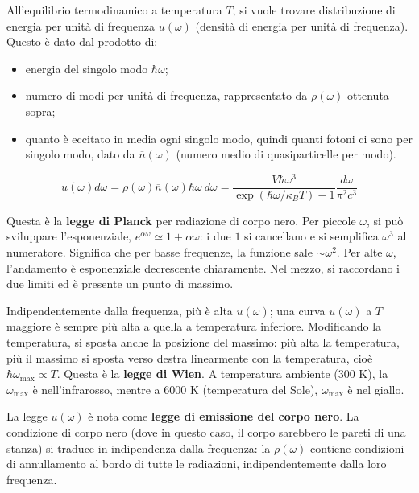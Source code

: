 \documentclass[10pt, a4paper]{scrartcl}
\numberwithin{equation}{subsection}
\theoremstyle{style1}
\theoremstyle{style2}
\newenvironment{boxenv}[1][]{
    \begin{eqbox}[#1]
    }{
   \end{eqbox}
}
\begin{document}
All'equilibrio termodinamico a temperatura $T$, si vuole trovare distribuzione di energia per unit\`a di frequenza $u(\omega)$ (densit\`a di energia per unit\`a di frequenza). 
Questo \`e dato dal prodotto di:
\begin{itemize}
	\item energia del singolo modo $\hbar \omega$;
	\item numero di modi per unit\`a di frequenza, rappresentato da $\rho (\omega)$ ottenuta sopra;
	\item quanto \`e eccitato in media ogni singolo modo, quindi quanti fotoni ci sono per singolo modo, dato da $\overline{n}(\omega)$ (numero medio di quasiparticelle per modo).
\end{itemize}
\begin{boxenv}[]
\begin{equation}
	u(\omega ) d\omega=\rho (\omega) \overline{n}(\omega) \hbar \omega \ d\omega= \frac{V \hbar  \omega^3}{\exp(\hbar \omega / \kappa _B T ) - 1} \frac{d\omega}{\pi^2 c^3}
\end{equation}
\end{boxenv}
\noindent Questa \`e la \textbf{legge di Planck} per radiazione di corpo nero. 
Per piccole $\omega$, si pu\`o sviluppare l'esponenziale, $e^{\alpha\omega}\simeq 1 + \alpha  \omega$: i due $1$ si cancellano e si semplifica $\omega^3$ al numeratore.
Significa che per basse frequenze, la funzione sale $\sim \omega^2$.
Per alte $\omega$, l'andamento \`e esponenziale decrescente chiaramente.
Nel mezzo, si raccordano i due limiti ed \`e presente un punto di massimo.

Indipendentemente dalla frequenza, pi\`u \`e alta $u(\omega)$; una curva $u(\omega)$ a $T$ maggiore \`e sempre pi\`u alta a quella a temperatura inferiore. 
Modificando la temperatura, si sposta anche la posizione del massimo: pi\`u alta la temperatura, pi\`u il massimo si sposta verso destra linearmente con la temperatura, cio\`e $\hbar \omega_\text{max}\propto T$. Questa \`e la \textbf{legge di Wien}.
A temperatura ambiente ($300$ K), la $\omega_\text{max} $ \`e nell'infrarosso, mentre a $6000$ K (temperatura del Sole), $\omega_\text{max}$ \`e nel giallo.

La legge $u(\omega)$ \`e nota come \textbf{legge di emissione del corpo nero}. 
La condizione di corpo nero (dove in questo caso, il corpo sarebbero le pareti di una stanza) si traduce in indipendenza dalla frequenza: la $\rho (\omega)$ contiene condizioni di annullamento al bordo di tutte le radiazioni, indipendentemente dalla loro frequenza.
\end{document}
